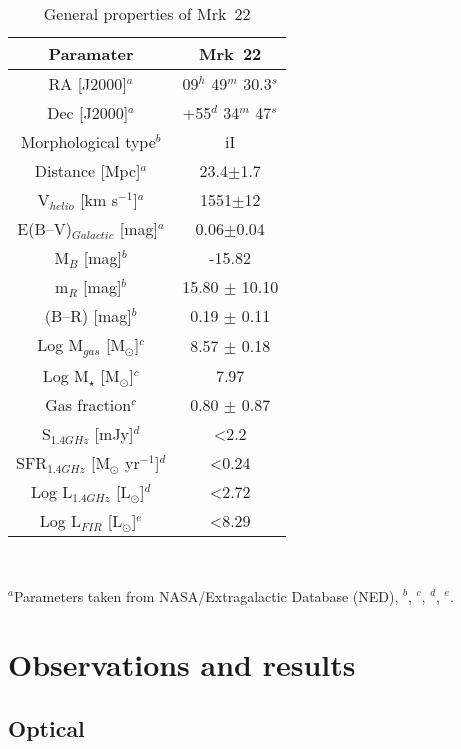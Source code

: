 \documentclass[useAMS,usenatbib]{mn2e}
\begin{document}
\begin{table}\label{tab:01}
\centering
\caption{General properties of Mrk~22}
\begin{tabular}{c|c}
\hline
Paramater & Mrk~22\\
\hline
RA [J2000]$^{a}$ & 09$^{h}$ 49$^{m}$ 30.3$^{s}$\\
Dec [J2000]$^{a}$ & +55$^{d}$ 34$^{m}$ 47$^{s}$\\
Morphological type$^{b}$ & iI\\
Distance [Mpc]$^{a}$ & 23.4$\pm$1.7\\
V$_{helio}$ [km s$^{-1}$]$^{a}$ & 1551$\pm$12\\
E(B--V)$_{Galactic}$ [mag]$^{a}$ & 0.06$\pm$0.04\\
M$_{B}$ [mag]$^{b}$ & -15.82\\
m$_{R}$ [mag]$^{b}$ & 15.80 $\pm$ 10.10\\
(B--R) [mag]$^{b}$ & 0.19 $\pm$ 0.11\\
Log M$_{gas}$ [M$_{\odot}$]$^{c}$ & 8.57 $\pm$ 0.18\\
Log M$_{\star}$ [M$_{\odot}$]$^{c}$ & 7.97\\
Gas fraction$^{c}$ & 0.80 $\pm$ 0.87\\
S$_{1.4 GHz}$ [mJy]$^{d}$ & \textless 2.2\\
SFR$_{1.4 GHz}$ [M$_{\odot}$ yr$^{-1}$]$^{d}$ & \textless 0.24\\
Log L$_{1.4 GHz}$ [L$_{\odot}$]$^{d}$ & \textless 2.72\\ 
Log L$_{FIR}$ [L$_{\odot}$]$^{e}$ & \textless 8.29\\  
\hline
\end{tabular}\\
\begin{flushleft}
$^{a}$Parameters taken from NASA/Extragalactic Database (NED),
$^{b}$\citet{2003ApJS..147...29G},
$^{c}$\citet{2013ApJ...764...44Z},
$^{d}$\citet{2002AJ....124..862H},
$^{e}$\citet{1991AJ....101.2034M}. 
\end{flushleft}
\end{table}



\section{Observations and results}

\subsection{Optical}
\end{document}
